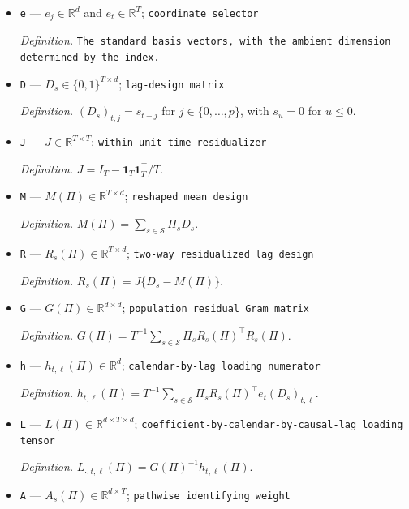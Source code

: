 \documentclass{article}
\begin{document}
\begin{itemize}
  \par\smallskip\noindent\emph{Definition.} \texttt{The vector of ones.}
  \item \texttt{e} --- \(e_j\in\mathbb R^{d}\) and \(e_t\in\mathbb R^{T}\); \texttt{coordinate selector}
  \par\smallskip\noindent\emph{Definition.} \texttt{The standard basis vectors,\allowbreak{} with the ambient dimension determined by the index.}
  \item \texttt{D} --- \(D_s\in\{0,1\}^{T\times d}\); \texttt{lag-\allowbreak{}design matrix}
  \par\smallskip\noindent\emph{Definition.} \((D_s)_{t,j}=s_{t-j}\) for \(j\in\{0,\ldots,p\}\), with \(s_u=0\) for \(u\le0\).
  \item \texttt{J} --- \(J\in\mathbb R^{T\times T}\); \texttt{within-\allowbreak{}unit time residualizer}
  \par\smallskip\noindent\emph{Definition.} \(J=I_T-\mathbf 1_T\mathbf 1_T^{\top}/T\).
  \item \texttt{M} --- \(M(\Pi)\in\mathbb R^{T\times d}\); \texttt{reshaped mean design}
  \par\smallskip\noindent\emph{Definition.} \(M(\Pi)=\sum_{s\in\mathcal S}\Pi_sD_s\).
  \item \texttt{R} --- \(R_s(\Pi)\in\mathbb R^{T\times d}\); \texttt{two-\allowbreak{}way residualized lag design}
  \par\smallskip\noindent\emph{Definition.} \(R_s(\Pi)=J\{D_s-M(\Pi)\}\).
  \item \texttt{G} --- \(G(\Pi)\in\mathbb R^{d\times d}\); \texttt{population residual Gram matrix}
  \par\smallskip\noindent\emph{Definition.} \(G(\Pi)=T^{-1}\sum_{s\in\mathcal S}\Pi_sR_s(\Pi)^{\top}R_s(\Pi)\).
  \item \texttt{h} --- \(h_{t,\ell}(\Pi)\in\mathbb R^{d}\); \texttt{calendar-\allowbreak{}by-\allowbreak{}lag loading numerator}
  \par\smallskip\noindent\emph{Definition.} \(h_{t,\ell}(\Pi)=T^{-1}\sum_{s\in\mathcal S}\Pi_sR_s(\Pi)^{\top}e_t(D_s)_{t,\ell}\).
  \item \texttt{L} --- \(L(\Pi)\in\mathbb R^{d\times T\times d}\); \texttt{coefficient-\allowbreak{}by-\allowbreak{}calendar-\allowbreak{}by-\allowbreak{}causal-\allowbreak{}lag loading tensor}
  \par\smallskip\noindent\emph{Definition.} \(L_{\cdot,t,\ell}(\Pi)=G(\Pi)^{-1}h_{t,\ell}(\Pi)\).
  \item \texttt{A} --- \(A_s(\Pi)\in\mathbb R^{d\times T}\); \texttt{pathwise identifying weight}

\end{itemize}
\end{document}
